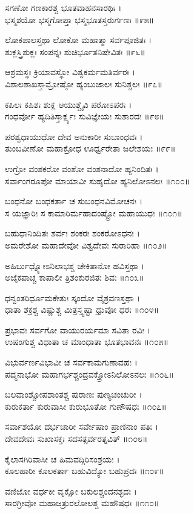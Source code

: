 ಸಗಣೋ ಗಣಕಾರಶ್ಚ ಭೂತವಾಹನಸಾರಥಿಃ ।\\
ಭಸ್ಮಶಯೋ ಭಸ್ಮಗೋಪ್ತಾ ಭಸ್ಮಭೂತಸ್ತರುರ್ಗಣಃ ॥೯೫॥

ಲೋಕಪಾಲಸ್ತಥಾ ಲೋಕೋ ಮಹಾತ್ಮಾ ಸರ್ವಪೂಜಿತಃ ।\\
ಶುಕ್ಲಸ್ತ್ರಿಶುಕ್ಲಃ ಸಂಪನ್ನಃ ಶುಚಿರ್ಭೂತನಿಷೇವಿತಃ ॥೯೬॥

ಆಶ್ರಮಸ್ಥಃ ಕ್ರಿಯಾವಸ್ಥೋ ವಿಶ್ವಕರ್ಮಮತಿರ್ವರಃ ।\\
ವಿಶಾಲಶಾಖಸ್ತಾಮ್ರೋಷ್ಠೋ ಹ್ಯಂಬುಜಾಲಃ ಸುನಿಶ್ಚಲಃ ॥೯೭॥

ಕಪಿಲಃ ಕಪಿಶಃ ಶುಕ್ಲ ಆಯುಶ್ಚೈವಿ ಪರೋಽಪರಃ ।\\
ಗಂಧರ್ವೋ ಹ್ಯದಿತಿಸ್ತಾರ್ಕ್ಷ್ಯಃ ಸುವಿಜ್ಞೇಯಃ ಸುಶಾರದಃ ॥೯೮॥

ಪರಶ್ವಧಾಯುಧೋ ದೇವ ಅನುಕಾರೀ ಸುಬಾಂಧವಃ ।\\
ತುಂಬವೀಣೋ ಮಹಾಕ್ರೋಧ ಊರ್ಧ್ವರೇತಾ ಜಲೇಶಯಃ ॥೯೯॥

ಉಗ್ರೋ ವಂಶಕರೋ ವಂಶೋ ವಂಶನಾದೋ ಹ್ಯನಿಂದಿತಃ ।\\
ಸರ್ವಾಂಗರೂಪೋ ಮಾಯಾವೀ ಸುಹೃದೋ ಹ್ಯನಿಲೋಽನಲಃ ॥೧೦೦॥

ಬಂಧನೋ ಬಂಧಕರ್ತಾ ಚ ಸುಬಂಧನವಿಮೋಚನಃ ।\\
ಸ ಯಜ್ಞಾರಿಃ ಸ ಕಾಮಾರಿರ್ಮಹಾದಂಷ್ಟ್ರೋ ಮಹಾಯುಧಃ ॥೧೦೧॥

ಬಹುಧಾನಿಂದಿತಃ ಶರ್ವಃ ಶಂಕರಃ ಶಂಕರೋಽಧನಃ ।\\
ಅಮರೇಶೋ ಮಹಾದೇವೋ ವಿಶ್ವದೇವಃ ಸುರಾರಿಹಾ ॥೧೦೨॥

ಅಹಿರ್ಬುಧ್ನ್ಯೋಽನಿಲಾಭಶ್ಚ ಚೇಕಿತಾನೋ ಹವಿಸ್ತಥಾ ।\\
ಅಜೈಕಪಾಚ್ಚ ಕಾಪಾಲೀ ತ್ರಿಶಂಕುರಜಿತಃ ಶಿವಃ ॥೧೦೩॥

ಧನ್ವಂತರಿರ್ಧೂಮಕೇತುಃ ಸ್ಕಂದೋ ವೈಶ್ರವಣಸ್ತಥಾ ।\\
ಧಾತಾ ಶಕ್ರಶ್ಚ ವಿಷ್ಣುಶ್ಚ ಮಿತ್ರಸ್ತ್ವಷ್ಟಾ ಧ್ರುವೋ ಧರಃ ॥೧೦೪॥

ಪ್ರಭಾವಃ ಸರ್ವಗೋ ವಾಯುರರ್ಯಮಾ ಸವಿತಾ ರವಿಃ ।\\
ಉಷಂಗುಶ್ಚ ವಿಧಾತಾ ಚ ಮಾಂಧಾತಾ ಭೂತಭಾವನಃ ॥೧೦೫॥

ವಿಭುರ್ವರ್ಣವಿಭಾವೀ ಚ ಸರ್ವಕಾಮಗುಣಾವಹಃ ।\\
ಪದ್ಮನಾಭೋ ಮಹಾಗರ್ಭಶ್ಚಂದ್ರವಕ್ತ್ರೋಽನಿಲೋಽನಲಃ ॥೧೦೬॥

ಬಲವಾಂಶ್ಚೋಪಶಾಂತಶ್ಚ ಪುರಾಣಃ ಪುಣ್ಯಚಂಚುರೀ ।\\
ಕುರುಕರ್ತಾ ಕುರುವಾಸೀ ಕುರುಭೂತೋ ಗುಣೌಷಧಃ ॥೧೦೭॥

ಸರ್ವಾಶಯೋ ದರ್ಭಚಾರೀ ಸರ್ವೇಷಾಂ ಪ್ರಾಣಿನಾಂ ಪತಿಃ ।\\
ದೇವದೇವಃ ಸುಖಾಸಕ್ತಃ ಸದಸತ್ಸರ್ವರತ್ನವಿತ್ ॥೧೦೮॥

ಕೈಲಾಸಗಿರಿವಾಸೀ ಚ ಹಿಮವದ್ಗಿರಿಸಂಶ್ರಯಃ ।\\
ಕೂಲಹಾರೀ ಕೂಲಕರ್ತಾ ಬಹುವಿದ್ಯೋ ಬಹುಪ್ರದಃ ॥೧೦೯॥

ವಣಿಜೋ ವರ್ಧಕೀ ವೃಕ್ಷೋ ಬಕುಲಶ್ಚಂದನಶ್ಛದಃ ।\\
ಸಾರಗ್ರೀವೋ ಮಹಾಜತ್ರುರಲೋಲಶ್ಚ ಮಹೌಷಧಃ ॥೧೧೦॥

